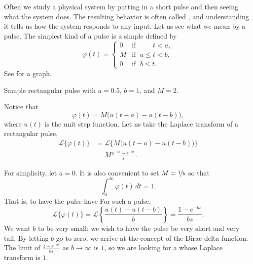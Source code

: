Often we study a physical system by putting in a short pulse 
and then seeing what the system does.
The resulting behavior is
often called \emph{},
and understanding it tells us how the system responds to any input.
Let us see what we mean by a pulse.
The simplest kind of a pulse is a simple
\emph{}
defined by
\begin{equation*}
\varphi(t) = 
\begin{cases}
0 & \text{if } \; \phantom{a \leq {}} t < a , \\
M & \text{if } \; a \leq t < b , \\
0 & \text{if } \; b \leq t .
\end{cases}
\end{equation*}
See  for a graph.

\begin{mywrapfig}[15]{3.25in}
\capstart
{}
\caption{Sample rectangular pulse with $a=0.5$, $b=1$, and $M = 2$.\label{lt:sqpulse}}
\end{mywrapfig}

Notice that
\begin{equation*}
\varphi(t) = M \bigl( u(t-a) - u(t-b) \bigr) ,
\end{equation*}
where $u(t)$ is the unit step function.
Let us take the Laplace transform of a rectangular pulse,
\begin{equation*}
\begin{split}
{\mathcal{L}} \bigl\{ \varphi(t) \bigr\}
& =
{\mathcal{L}} \bigl\{ M \bigl( u(t-a) - u(t-b) \bigr)  \bigr\}
\\
& =
M
\frac{e^{-as} - e^{-bs}}{s} .
\end{split}
\end{equation*}

For simplicity, let $a=0$.
It is also convenient
to set $M = \nicefrac{1}{b}$ so that
\begin{equation*}
\int_0^\infty \varphi(t) \,dt = 1 .
\end{equation*}
That is, to have the pulse have 
For such a pulse,
\begin{equation*}
{\mathcal{L}} \bigl\{ \varphi(t) \bigr\}
=
{\mathcal{L}} \left\{ \frac{u(t) - u(t-b)}{b}  \right\}
=
\frac{1 - e^{-bs}}{bs} .
\end{equation*}
We want $b$ to be very small; we wish to have
the pulse be very short and very tall.  By letting $b$ go to zero, we arrive
at the concept of the Dirac delta function.  The limit
of $\frac{1-e^{-bs}}{bs}$
as $b \to \infty$ is $1$, so we are looking for a  whose Laplace
transform is $1$.

